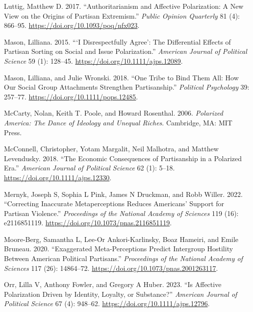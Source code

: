 \documentclass[
  12pt,
  a4paper,
  DIV=11,
  numbers=noendperiod]{scrartcl}
\newlength{\cslhangindent}
\newenvironment{CSLReferences}[2] %
 {\begin{list}{}{%
  \setlength{\itemindent}{0pt}
  \setlength{\leftmargin}{0pt}
  \setlength{\parsep}{0pt}
  \ifodd #1
   \setlength{\leftmargin}{\cslhangindent}
   \setlength{\itemindent}{-1\cslhangindent}
  \fi
  \setlength{\itemsep}{#2\baselineskip}}}
 {\end{list}}
\begin{document}
\begin{CSLReferences}{1}{0}
Luttig, Matthew D. 2017. {``Authoritarianism and Affective Polarization:
A New View on the Origins of Partisan Extremism.''} \emph{Public Opinion
Quarterly} 81 (4): 866--95. \url{https://doi.org/10.1093/poq/nfx023}.

Mason, Lilliana. 2015. {``{`I Disrespectfully Agree'}: The Differential
Effects of Partisan Sorting on Social and Issue Polarization.''}
\emph{American Journal of Political Science} 59 (1): 128--45.
\url{https://doi.org/10.1111/ajps.12089}.

Mason, Lilliana, and Julie Wronski. 2018. {``One Tribe to Bind Them All:
How Our Social Group Attachments Strengthen Partisanship.''}
\emph{Political Psychology} 39: 257--77.
\url{https://doi.org/10.1111/pops.12485}.

McCarty, Nolan, Keith T. Poole, and Howard Rosenthal. 2006.
\emph{Polarized America: The Dance of Ideology and Unequal Riches}.
Cambridge, MA: MIT Press.

McConnell, Christopher, Yotam Margalit, Neil Malhotra, and Matthew
Levendusky. 2018. {``The Economic Consequences of Partisanship in a
Polarized Era.''} \emph{American Journal of Political Science} 62 (1):
5--18. \url{https://doi.org/10.1111/ajps.12330}.

Mernyk, Joseph S, Sophia L Pink, James N Druckman, and Robb Willer.
2022. {``Correcting Inaccurate Metaperceptions Reduces Americans'
Support for Partisan Violence.''} \emph{Proceedings of the National
Academy of Sciences} 119 (16): e2116851119.
\url{https://doi.org/10.1073/pnas.2116851119}.

Moore-Berg, Samantha L, Lee-Or Ankori-Karlinsky, Boaz Hameiri, and Emile
Bruneau. 2020. {``Exaggerated Meta-Perceptions Predict Intergroup
Hostility Between American Political Partisans.''} \emph{Proceedings of
the National Academy of Sciences} 117 (26): 14864--72.
\url{https://doi.org/10.1073/pnas.2001263117}.

Orr, Lilla V, Anthony Fowler, and Gregory A Huber. 2023. {``Is Affective
Polarization Driven by Identity, Loyalty, or Substance?''}
\emph{American Journal of Political Science} 67 (4): 948--62.
\url{https://doi.org/10.1111/ajps.12796}.


\end{CSLReferences}
\end{document}
